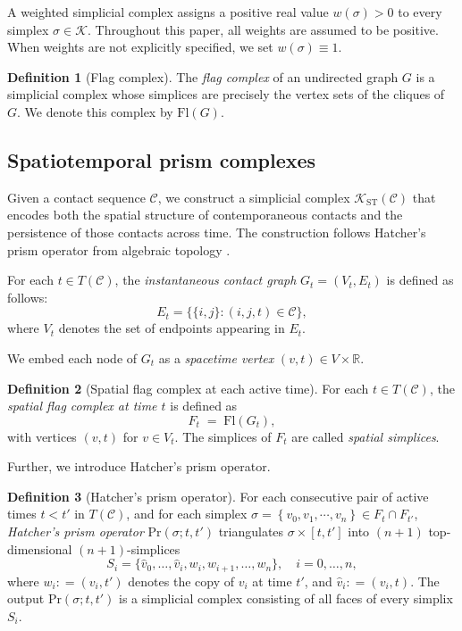 \documentclass[
    pre,
    twocolumn,
    superscriptaddress,
    showpacs,
    nofootinbib,
    amsmath,
    amssymb,
    floatfix
]{revtex4-2}
\newcommand{\R}{\mathbb{R}}
\newcommand{\K}{\mathcal{K}}
\theoremstyle{plain} %
\theoremstyle{definition} %
\newtheorem{definition}{\indent Definition}
\begin{document}
A weighted simplicial complex assigns a positive real value $w(\sigma)>0$ to every simplex $\sigma\in\K$. 
Throughout this paper, all weights are assumed to be positive. When weights are not explicitly specified, we set $w(\sigma)\equiv 1$.

\begin{definition}[Flag complex]
The \emph{flag complex} of an undirected graph $G$ is a simplicial complex whose simplices are precisely the vertex sets of the cliques of $G$.  We denote this complex by $\mathrm{Fl}(G)$.
\end{definition}

\subsection{Spatiotemporal prism complexes}\label{ssec:prism}

Given a contact sequence $\mathcal{C}$, we construct a simplicial complex $\K_{\mathrm{ST}}(\mathcal{C})$ that encodes both the spatial structure of contemporaneous contacts and the persistence of those contacts across time. 
The construction follows Hatcher's prism operator from algebraic topology \cite[\S\,2.1]{Hatcher2002}.

For each $t\in T(\mathcal{C})$, the \emph{instantaneous contact graph} $G_t = (V_t, E_t)$ is defined as follows:
\begin{equation*}
    E_t = \bigl\{\{i,j\} : (i,j,t)\in\mathcal{C}\bigr\},
\end{equation*}
where $V_t$ denotes the set of endpoints appearing in $E_t$.  

We embed each node of $G_t$ as a \emph{spacetime vertex} $(v,t)\in V\times\R$. 
\begin{definition}[Spatial flag complex at each active time]
For each $t\in T(\mathcal{C})$, the \emph{spatial flag complex at time $t$} is defined as
\begin{equation*}
    F_t \;=\; \mathrm{Fl}(G_t) ,
\end{equation*}
with vertices $(v,t)$ for $v\in V_t$.
The simplices of $F_t$ are called \emph{spatial simplices}.
\end{definition}

Further, we introduce Hatcher's prism operator.
\begin{definition}[Hatcher's prism operator]\label{def:prism_op}
For each consecutive pair of active times $t<t'$ in $T(\mathcal{C})$, and for each simplex $\sigma = \left\{ v_0, v_1, \cdots, v_n \right\} \in F_t \cap F_{t'}$, \emph{Hatcher's prism operator} $\mathrm{Pr}(\sigma; t, t')$ triangulates $\sigma\times[t,t']$ into $(n+1)$ top-dimensional $(n+1)$-simplices
\begin{equation}\label{eq:prism}
    S_i = \{\hat v_0,\dots,\hat v_i,w_i,w_{i+1},\dots,w_n\},
    \quad i=0,\dots,n,
\end{equation}
where $w_i \mathrel{\mathop:}= (v_i,t')$ denotes the copy of $v_i$ at time $t'$, and $\hat v_i \mathrel{\mathop:}= (v_i,t)$.
The output $\mathrm{Pr}(\sigma; t, t')$ is a simplicial complex consisting of all faces of every simplix $S_i$.
\end{definition}
\end{document}
